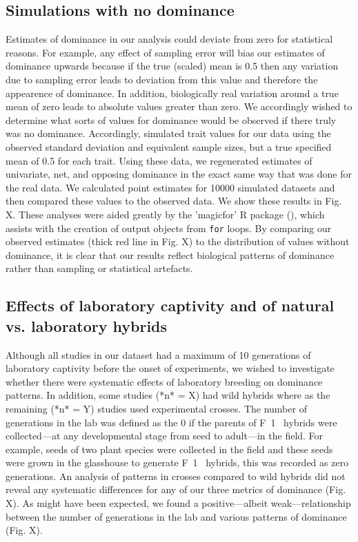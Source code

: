 \documentclass[times, twoside, watermark]{zHenriquesLab-StyleBioRxiv}
\begin{document}
\subsection{Simulations with no dominance}
Estimates of dominance in our analysis could deviate from zero for statistical reasons. For example, any effect of sampling error will bias our estimates of dominance upwards because if the true (scaled) mean is 0.5 then any variation due to sampling error leads to deviation from this value and therefore the appearence of dominance. In addition, biologically real variation around a true mean of zero leads to absolute values greater than zero. We accordingly wished to determine what sorts of values for dominance would be observed if there truly was no dominance. Accordingly, simulated trait values for our data using the observed standard deviation and equivalent sample sizes, but a true specified mean of 0.5 for each trait. Using these data, we regenerated estimates of univariate, net, and opposing dominance in the exact same way that was done for the real data. We calculated point estimates for 10000 simulated datasets and then compared these values to the observed data. We show these results in Fig. X. These analyses were aided greatly by the 'magicfor' R package (\citealt{Makiyama2016}), which assists with the creation of output objects from \texttt{for} loops. By comparing our observed estimates (thick red line in Fig. X) to the distribution of values without dominance, it is clear that our results reflect biological patterns of dominance rather than sampling or statistical artefacts.

\subsection{Effects of laboratory captivity and of natural vs. laboratory hybrids}

Although all studies in our dataset had a maximum of 10 generations of laboratory captivity before the onset of experiments, we wished to investigate whether there were systematic effects of laboratory breeding on dominance patterns. In addition, some studies (*n* = X) had wild hybrids where as the remaining (*n* = Y) studies used experimental crosses. The number of generations in the lab was defined as the 0 if the parents of F~1~ hybrids were collected---at any developmental stage from seed to adult---in the field. For example, seeds of two plant species were collected in the field and these seeds were grown in the glasshouse to generate F~1~ hybrids, this was recorded as zero generations.
An analysis of patterns in crosses compared to wild hybrids did not reveal any systematic differences for any of our three metrics of dominance (Fig. X). As might have been expected, we found a positive---albeit weak---relationship between the number of generations in the lab and various patterns of dominance (Fig. X). \par
\end{document}
